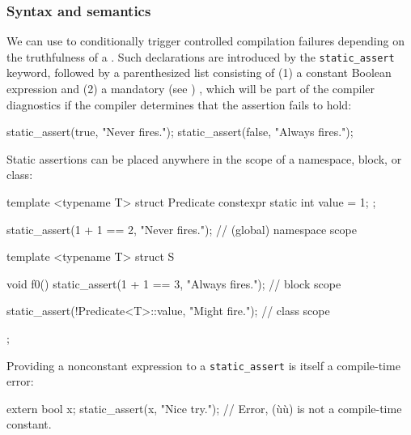 \subsubsection[Syntax and semantics]{Syntax and semantics}\label{syntax-and-semantics}

We can use  to conditionally trigger
controlled compilation failures depending on the truthfulness of a
. Such declarations are introduced by the
\lstinline!static_assert! keyword, followed by a parenthesized list
consisting of (1) a constant Boolean expression and (2) a mandatory (see
)
, which will be
part of the compiler diagnostics if the compiler determines that the
assertion fails to hold:

\begin{emcppslisting}[emcppserrorlines=2]
static_assert(true, "Never fires.");
static_assert(false, "Always fires.");
\end{emcppslisting}

\noindent Static assertions can be placed anywhere in the scope of a namespace,
block, or class:

\begin{emcppshiddenlisting}[emcppsbatch=e1]
template <typename T> struct Predicate
{
   constexpr static int value = 1;
};
\end{emcppshiddenlisting}
\begin{emcppslisting}[emcppsbatch=e1,emcppserrorlines=8]
static_assert(1 + 1 == 2, "Never fires.");  // (global) namespace scope

template <typename T>
struct S
{
    void f0()
    {
        static_assert(1 + 1 == 3, "Always fires.");  // block scope
    }

    static_assert(!Predicate<T>::value, "Might fire.");  // class scope
};
\end{emcppslisting}

\noindent Providing a nonconstant expression to a \lstinline!static_assert! is
itself a compile-time error:

\begin{emcppslisting}
extern bool x;
static_assert(x, "Nice try.");  // Error, (ù{}ù) is not a compile-time constant.
\end{emcppslisting}


